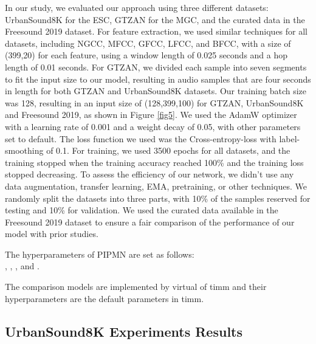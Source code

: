 \documentclass[runningheads]{llncs}
\begin{document}
In our study, we evaluated our approach using three different datasets: UrbanSound8K for the ESC, GTZAN for the MGC, and the curated data in the Freesound 2019 dataset. For feature extraction, we used similar techniques for all datasets, including NGCC, MFCC, GFCC, LFCC, and BFCC, with a size of (399,20) for each feature, using a window length of 0.025 seconds and a hop length of 0.01 seconds.  For GTZAN, we divided each sample into seven segments to fit the input size to our model, resulting in audio samples that are four seconds in length for both GTZAN and UrbanSound8K datasets. Our training batch size was 128, resulting in an input size of (128,399,100) for GTZAN, UrbanSound8K and Freesound 2019, as shown in Figure \ref{fig5}. We used the AdamW optimizer with a learning rate of 0.001 and a weight decay of 0.05, with other parameters set to default. The loss function we used was the Cross-entropy-loss with label-smoothing of 0.1. For training, we used 3500 epochs for all datasets, and the training stopped when the training accuracy reached 100\% and the training loss stopped decreasing. To assess the efficiency of our network, we didn't use any data augmentation, transfer learning, EMA, pretraining, or other techniques. We randomly split the datasets into three parts, with 10\% of the samples reserved for testing and 10\% for validation. We used the curated data available in the Freesound 2019 dataset to ensure a fair comparison of the performance of our model with prior studies.

The hyperparameters of PIPMN are set as follows: \\, , ,  and .

The comparison models are implemented by virtual of timm\cite{timm} and their hyperparameters are the default parameters in timm.

\subsection{UrbanSound8K Experiments Results}
\end{document}
